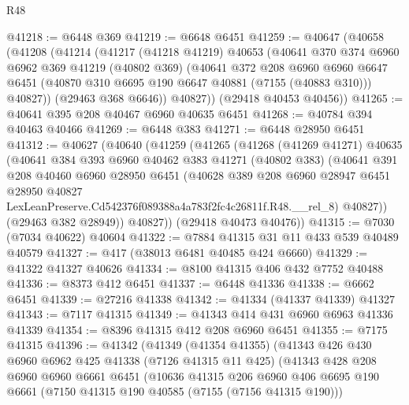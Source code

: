 \begin{lexlean}{R48}
\begin{coremodule}
@41218 := @6448 @369
@41219 := @6648 @6451
@41259 := @40647
    (@40658
      (@41208
        (@41214
          (@41217
            (@41218 @41219)
            @40653
            (@40641
              @370
              @374
              @6960
              @6962
              @369
              @41219
              (@40802 @369)
              (@40641
                @372
                @208
                @6960
                @6960
                @6647
                @6451
                (@40870 @310 @6695 @190 @6647 @40881 (@7155 (@40883 @310)))
                @40827))
            (@29463 @368 @6646))
          @40827))
      (@29418 @40453 @40456))
@41265 := @40641 @395 @208 @40467 @6960 @40635 @6451
@41268 := @40784 @394 @40463 @40466
@41269 := @6448 @383
@41271 := @6448 @28950 @6451
@41312 := @40627
    (@40640
      (@41259
        (@41265
          (@41268
            (@41269 @41271)
            @40635
            (@40641
              @384
              @393
              @6960
              @40462
              @383
              @41271
              (@40802 @383)
              (@40641
                @391
                @208
                @40460
                @6960
                @28950
                @6451
                (@40628
                  @389
                  @208
                  @6960
                  @28947
                  @6451
                  @28950
                  @40827
                  LexLeanPreserve.Cd542376f089388a4a783f2fc4c26811f.R48.__rel_8)
                @40827))
            (@29463 @382 @28949))
          @40827))
      (@29418 @40473 @40476))
@41315 := @7030 (@7034 @40622) @40604
@41322 := @7884 @41315 @31 @11 @433 @539 @40489 @40579
@41327 := @417 (@38013 @6481 @40485 @424 @6660)
@41329 := @41322 @41327 @40626
@41334 := @8100 @41315 @406 @432 @7752 @40488
@41336 := @8373 @412 @6451
@41337 := @6448 @41336
@41338 := @6662 @6451
@41339 := @27216 @41338
@41342 := @41334 (@41337 @41339) @41327
@41343 := @7117 @41315
@41349 := @41343 @414 @431 @6960 @6963 @41336 @41339
@41354 := @8396 @41315 @412 @208 @6960 @6451
@41355 := @7175 @41315
@41396 := @41342
    (@41349
      (@41354 @41355)
      (@41343
        @426
        @430
        @6960
        @6962
        @425
        @41338
        (@7126 @41315 @11 @425)
        (@41343
          @428
          @208
          @6960
          @6960
          @6661
          @6451
          (@10636
            @41315
            @206
            @6960
            @406
            @6695
            @190
            @6661
            (@7150 @41315 @190 @40585 (@7155 (@7156 @41315 @190)))

\end{coremodule}
\end{lexlean}
